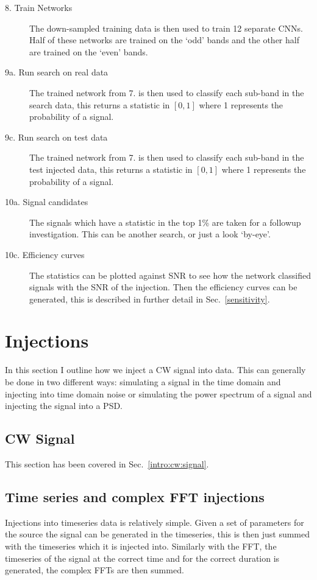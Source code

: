\begin{description}
    \item[8. Train Networks] The down-sampled training data is then used to train 12 separate \acp{CNN}. Half of these networks are trained on the `odd' bands and the other half are trained on the `even' bands. 

    \item[9a. Run search on real data] The trained network from 7. is then used to classify each sub-band in the search data, this returns a statistic in $[0,1]$ where 1 represents the probability of a signal. 
    
    \item[9c. Run search on test data] The trained network from 7. is then used to classify each sub-band in the test injected data, this returns a statistic in $[0,1]$ where 1 represents the probability of a signal. 
    
    \item[10a. Signal candidates] The signals which have a statistic in the top 1\% are taken for a followup investigation. This can be another search, or just a look `by-eye'.
    
    \item[10c. Efficiency curves] The statistics can be plotted against \ac{SNR} to see how the network classified signals with the \ac{SNR} of the injection. Then the efficiency curves can be generated, this is described in further detail in Sec.~\ref{sensitivity}.
    

  
\end{description}



\section{Injections}
In this section I outline how we inject a \ac{CW} signal into data. This can generally be done in two different ways: simulating a signal in the time domain and injecting into time domain noise or simulating the power spectrum of a signal and injecting the signal into a \ac{PSD}.
\subsection{CW Signal}
This section has been covered in Sec.~\ref{intro:cw:signal}.

\subsection{Time series and complex \ac{FFT} injections}
Injections into timeseries data is relatively simple. Given a set of parameters for the source the signal can be generated in the timeseries, this is then just summed with the timeseries which it is injected into. 
Similarly with the \ac{FFT}, the timeseries of the signal at the correct time and for the correct duration is generated, the complex \acp{FFT} are then summed.

